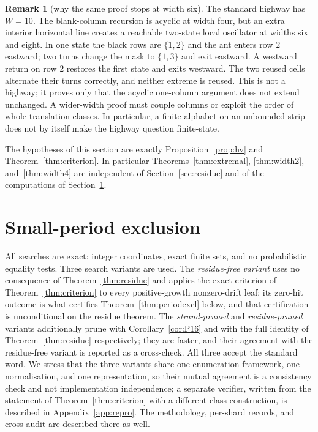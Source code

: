 \documentclass[11pt,reqno]{amsart}
\theoremstyle{plain}
\theoremstyle{definition}
\newtheorem{remark}[theorem]{Remark}
\begin{document}
\begin{remark}[why the same proof stops at width six]\label{rem:width4}
The standard highway has $W=10$.  The blank-column recursion is acyclic at width
four, but an extra interior horizontal line creates a reachable two-state local
oscillator at widths six and eight.  In one state the black rows are $\{1,2\}$ and
the ant enters row $2$ eastward; two turns change the mask to $\{1,3\}$ and exit
eastward.  A westward return on row $2$ restores the first state and exits westward.
The two reused cells alternate their turns correctly, and neither extreme is reused.
This is not a highway; it proves only that the acyclic one-column argument does not
extend unchanged.  A wider-width proof must couple columns or exploit the order of
whole translation classes.  In particular, a finite alphabet on an unbounded strip
does not by itself make the highway question finite-state.
\end{remark}

The hypotheses of this section are exactly Proposition~\ref{prop:hv} and
Theorem~\ref{thm:criterion}. In particular Theorems~\ref{thm:extremal},
\ref{thm:width2}, and~\ref{thm:width4} are independent of Section~\ref{sec:residue} and of the
computations of Section~\ref{sec:computation}.

\section{Small-period exclusion}\label{sec:computation}

All searches are exact: integer coordinates, exact finite sets, and no probabilistic
equality tests. Three search variants are used. The \emph{residue-free variant} uses no
consequence of Theorem~\ref{thm:residue} and applies the exact criterion of
Theorem~\ref{thm:criterion} to every positive-growth nonzero-drift leaf; its zero-hit
outcome is what certifies Theorem~\ref{thm:periodexcl} below, and that certification
is unconditional on the residue theorem. The \emph{strand-pruned} and
\emph{residue-pruned} variants additionally prune with Corollary~\ref{cor:P16} and
with the full identity of Theorem~\ref{thm:residue} respectively; they are faster, and
their agreement with the residue-free variant is reported as a cross-check. All three
accept the standard word. We stress that the three variants share one enumeration
framework, one normalisation, and one representation, so their mutual agreement is a
consistency check and not implementation independence; a separate verifier, written
from the statement of Theorem~\ref{thm:criterion} with a different class construction,
is described in Appendix~\ref{app:repro}. The methodology, per-shard records, and
cross-audit are described there as well.
\end{document}
